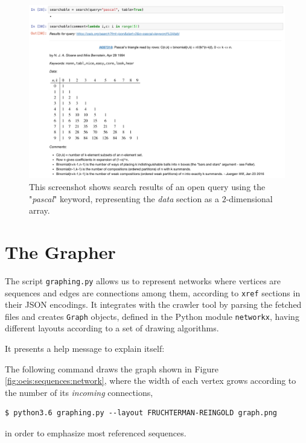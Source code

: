\begin{figure}
\includegraphics{OEIS/notebook-pascal}
\caption{This screenshot shows search results of an open query using the
"\emph{pascal}" keyword, representing the \emph{data} section as a
$2$-dimensional array.  }
\label{fig:oeis:notebook:pascal}
\end{figure}

\section{The Grapher}

The script \verb|graphing.py| allows us to represent networks where vertices
are sequences and edges are connections among them, according to \verb|xref|
sections in their JSON encodings. It integrates with the crawler tool by
parsing the fetched files and creates \verb|Graph| objects, defined in the
Python module \verb|networkx|, having different layouts according to a set of
drawing algorithms.

It presents a help message to explain itself:

\begin{example}
The following command draws the graph shown in Figure
\ref{fig:oeis:sequences:network}, where the width of each vertex grows
according to the number of its \textit{incoming} connections,
\begin{Verbatim}[fontsize=\small]
$ python3.6 graphing.py --layout FRUCHTERMAN-REINGOLD graph.png
\end{Verbatim}
in order to emphasize most referenced sequences.
\end{example}

